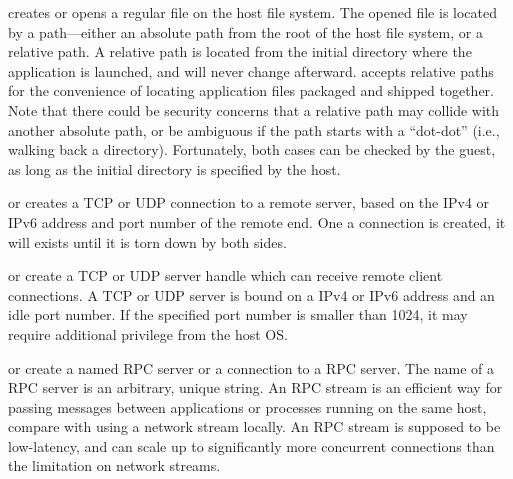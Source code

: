 \begin{compactitem}

\item {} creates or opens a regular file on the host file system.
The opened file is located by a path---either an absolute path from the root of the host file system, 
or a relative path.
A relative path is located from the initial directory where the application is launched,
and will never change afterward.
 accepts relative paths for the convenience of locating application files packaged and shipped together.
Note that there could be security concerns
that a relative path may collide with another absolute path, or be ambiguous if the path starts with a ``dot-dot'' (i.e., walking back a directory).
Fortunately, both cases can be checked by the guest, as long as
the initial directory is specified by the host.

\item {} or  creates a TCP or UDP connection to a remote server,
based on the IPv4 or IPv6 address and port number of the remote end.
One a connection is created,
it will exists until it is torn down by both sides.

\item {} or  create a TCP or UDP server handle which can receive remote client connections.
A TCP or UDP server is bound on a IPv4 or IPv6 address and an idle port number.
If the specified port number is smaller than 1024,
it may require additional privilege from the host OS.

\item {} or  create a named RPC server or a connection to a RPC server.
The name of a RPC server is an arbitrary, unique string.
An RPC stream is an efficient way for passing messages between applications or processes
running on the same host,
compare with using a network stream locally.
An RPC stream is supposed to be low-latency, and can scale up to significantly
more concurrent connections
than the limitation on network streams.


\end{compactitem}



